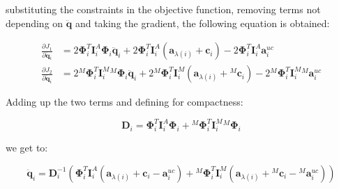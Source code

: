 substituting the constraints in the objective function, removing terms not depending on $\ddot{\mathbf{q}}$ and taking the gradient, the following equation is obtained:

\begin{align}
    \frac{\partial J _1}{\partial \ddot{\mathbf{q}} _i} & = 2 \boldsymbol{\Phi} ^T _i \mathbf{I} ^A _i \boldsymbol{\Phi} _i \ddot{\mathbf{q}} _i + 2 \boldsymbol{\Phi} ^T _i \mathbf{I} ^A _i (\mathbf{a} _{\lambda (i)} + \mathbf{c} _i) - 2 \boldsymbol{\Phi} ^T _i \mathbf{I} ^A _i \mathbf{a} ^{uc} _i \nonumber                                        \\
    \frac{\partial J _2}{\partial \ddot{\mathbf{q}} _i} & = 2 {} ^M \boldsymbol{\Phi} ^T _i \mathbf{I} ^M _i {} ^M \boldsymbol{\Phi} _i \ddot{\mathbf{q}} _i + 2 {} ^M  \boldsymbol{\Phi} ^T _i \mathbf{I} ^M _i (\mathbf{a} _{\lambda (i)} + {} ^M  \mathbf{c} _i) - 2 {} ^M \boldsymbol{\Phi} ^T _i \mathbf{I} ^M _i {} ^M \mathbf{a} ^{uc} _i  \nonumber
\end{align}

Adding up the two terms and defining for compactness:

\begin{equation}
    \mathbf{D} _i = \boldsymbol{\Phi} ^T _i \mathbf{I} ^A _i \boldsymbol{\Phi} _i + {} ^M \boldsymbol{\Phi} ^T _i \mathbf{I} ^M _i {} ^M \boldsymbol{\Phi} _i
\end{equation}

we get to:

\begin{equation}
    \ddot{\mathbf{q}} _i = \mathbf{D} _i ^{-1} (\boldsymbol{\Phi} ^T _i \mathbf{I} ^A _i (\mathbf{a} _{\lambda (i)} + \mathbf{c} _i - \mathbf{a} ^{uc} _i) + {} ^M \boldsymbol{\Phi} ^T _i \mathbf{I} ^M _i ( \mathbf{a} _{\lambda (i)} + {} ^M \mathbf{c} _i - {} ^M \mathbf{a} ^{uc} _i))
\end{equation}

